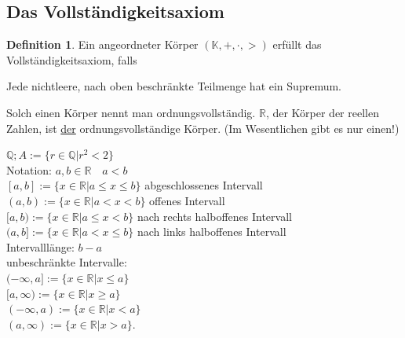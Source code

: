 \documentclass[12pt,a4paper,titlepage]{article} %
\theoremstyle{definition}
\newtheorem{defi}[satz]{Definition}
\theoremstyle{remark}
\begin{document}
\subsection{Das Vollständigkeitsaxiom}
\begin{defi}
	Ein angeordneter Körper $(\mathbb{K},+,\cdot,>)$ erfüllt das Vollständigkeitsaxiom, falls\\
	\begin{center}
		Jede nichtleere, nach oben beschränkte Teilmenge hat ein Supremum.
	\end{center}
	Solch einen Körper nennt man ordnungsvollständig. $\mathbb{R}$, der Körper der reellen Zahlen, ist \underline{der} ordnungsvollständige Körper. (Im Wesentlichen gibt es nur einen!)
\end{defi}
$\mathbb{Q}; A:= \{r\in\mathbb{Q}|r^2 < 2\}$\\
Notation: $a,b\in\mathbb{R} \quad a<b$\\
$[a,b] := \{x\in\mathbb{R}|a\leq x\leq b\}$ abgeschlossenes Intervall\\
$(a,b) := \{x\in\mathbb{R} | a<x<b\}$ offenes Intervall\\
$[a,b) := \{x\in\mathbb{R}|a\leq x<b\}$ nach rechts halboffenes Intervall\\
$(a,b] := \{x\in\mathbb{R}|a<x\leq b\}$ nach links halboffenes Intervall\\
Intervalllänge: $b-a$\\
unbeschränkte Intervalle:\\
$(-\infty, a] := \{x\in\mathbb{R}|x\leq a\}$\\
$[a,\infty) := \{x\in\mathbb{R}|x\geq a\}$\\
$(-\infty, a) := \{x\in\mathbb{R}|x<a\}$\\
$(a, \infty) := \{x\in\mathbb{R}|x>a\}$.
\end{document}
